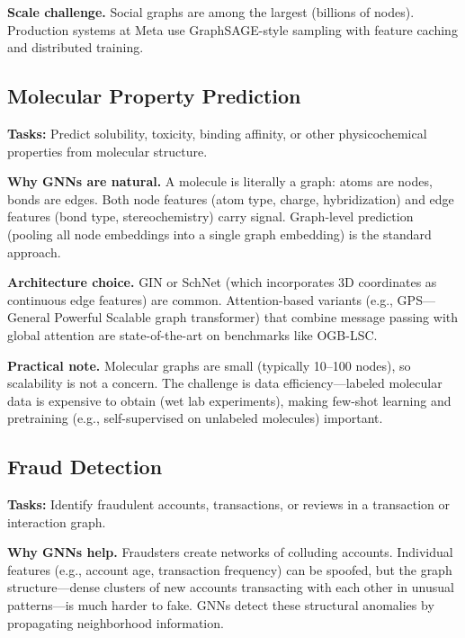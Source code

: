\textbf{Scale challenge.} Social graphs are among the largest (billions of nodes). Production systems at Meta use GraphSAGE-style sampling with feature caching and distributed training.

\subsection{Molecular Property Prediction}

\textbf{Tasks:} Predict solubility, toxicity, binding affinity, or other physicochemical properties from molecular structure.

\textbf{Why GNNs are natural.} A molecule is literally a graph: atoms are nodes, bonds are edges. Both node features (atom type, charge, hybridization) and edge features (bond type, stereochemistry) carry signal. Graph-level prediction (pooling all node embeddings into a single graph embedding) is the standard approach.

\textbf{Architecture choice.} GIN or SchNet (which incorporates 3D coordinates as continuous edge features) are common. Attention-based variants (e.g., GPS---General Powerful Scalable graph transformer) that combine message passing with global attention are state-of-the-art on benchmarks like OGB-LSC.

\textbf{Practical note.} Molecular graphs are small (typically 10--100 nodes), so scalability is not a concern. The challenge is data efficiency---labeled molecular data is expensive to obtain (wet lab experiments), making few-shot learning and pretraining (e.g., self-supervised on unlabeled molecules) important.

\subsection{Fraud Detection}

\textbf{Tasks:} Identify fraudulent accounts, transactions, or reviews in a transaction or interaction graph.

\textbf{Why GNNs help.} Fraudsters create networks of colluding accounts. Individual features (e.g., account age, transaction frequency) can be spoofed, but the graph structure---dense clusters of new accounts transacting with each other in unusual patterns---is much harder to fake. GNNs detect these structural anomalies by propagating neighborhood information.

